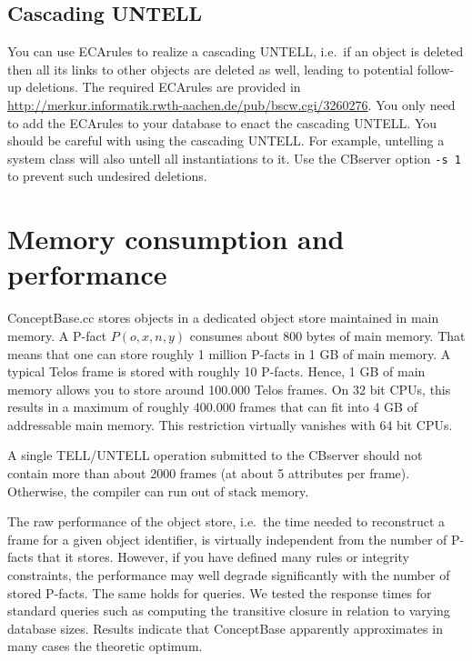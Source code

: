 \subsection{Cascading UNTELL}
\label{sec:cascuntell}

You can use ECArules to realize a cascading UNTELL, i.e.\  if an object is deleted then
all its links to other objects are deleted as well, leading to potential follow-up deletions.
The required ECArules are provided in 
\url{http://merkur.informatik.rwth-aachen.de/pub/bscw.cgi/3260276}.
You only need to add the ECArules to your database to enact the cascading UNTELL.
You should be careful with using the cascading UNTELL. For example, untelling
a system class will also untell all instantiations to it. Use the CBserver
option {\tt -s 1} to prevent such undesired deletions.




\section{Memory consumption and performance}
\label{sec:restrictions}

ConceptBase.cc stores objects in a dedicated object store maintained in
main memory. A P-fact $P(o,x,n,y)$ consumes about 800 bytes of main memory.
That means that one can store roughly 1 million P-facts in 1 GB of main memory.
A typical Telos frame is stored with roughly 10 P-facts. Hence, 1 GB of main
memory allows you to store around 100.000 Telos frames.
On 32 bit CPUs, this results in a maximum of roughly 400.000 frames that
can fit into 4 GB of addressable main memory. This restriction virtually
vanishes with 64 bit CPUs.

A single TELL/UNTELL operation submitted to the CBserver should
not contain more than about 2000 frames (at about 5 attributes per frame).
Otherwise, the compiler can run out of stack memory.

The raw performance of the object store, i.e.\ the time needed to reconstruct a 
frame for a given object identifier, is virtually independent from
the number of P-facts that it stores. However, if you have defined many rules
or integrity constraints, the performance may well degrade significantly
with the number of stored P-facts. The same holds for queries. 
We tested the response times for standard queries such as computing the
transitive closure in relation to varying database sizes. Results indicate that
ConceptBase apparently approximates in many cases the theoretic optimum. 

